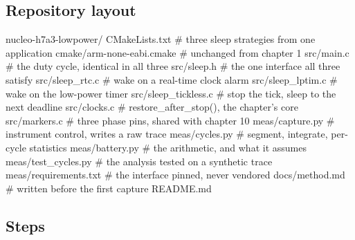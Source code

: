 \subsection*{Repository layout}

\begin{plaincode}
nucleo-h7a3-lowpower/
  CMakeLists.txt                  # three sleep strategies from one application
  cmake/arm-none-eabi.cmake       # unchanged from chapter 1
  src/main.c                      # the duty cycle, identical in all three
  src/sleep.h                     # the one interface all three satisfy
  src/sleep_rtc.c                 # wake on a real-time clock alarm
  src/sleep_lptim.c               # wake on the low-power timer
  src/sleep_tickless.c            # stop the tick, sleep to the next deadline
  src/clocks.c                    # restore_after_stop(), the chapter's core
  src/markers.c                   # three phase pins, shared with chapter 10
  meas/capture.py                 # instrument control, writes a raw trace
  meas/cycles.py                  # segment, integrate, per-cycle statistics
  meas/battery.py                 # the arithmetic, and what it assumes
  meas/test_cycles.py             # the analysis tested on a synthetic trace
  meas/requirements.txt           # the interface pinned, never vendored
  docs/method.md                  # written before the first capture
  README.md
\end{plaincode}

\subsection*{Steps}

